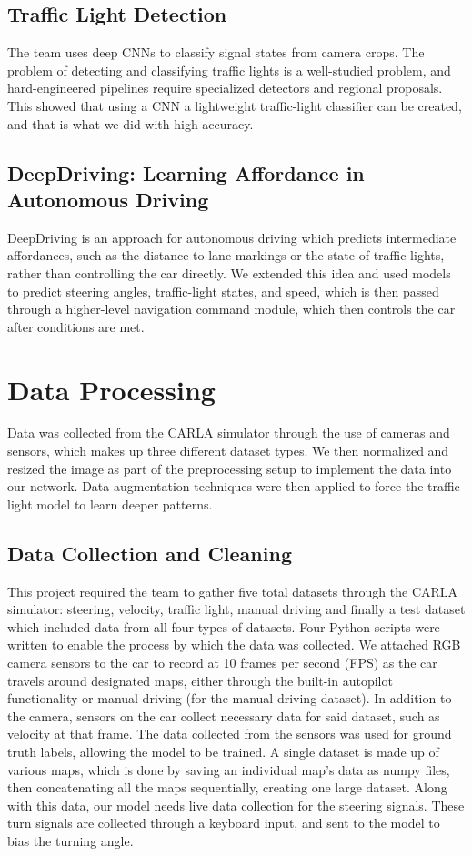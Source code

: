 \documentclass{article} %
\begin{document}
\subsection{Traffic Light Detection \citep{3.4Ref}}
The team uses deep CNNs to classify signal states from camera crops. The problem of detecting and classifying traffic lights is a
well-studied problem, and hard-engineered pipelines require specialized detectors and regional proposals. This showed that using a
CNN a lightweight traffic-light classifier can be created, and that is what we did with high accuracy.

\subsection{DeepDriving: Learning Affordance in Autonomous Driving \citep{3.5Ref}}
DeepDriving is an approach for autonomous driving which predicts intermediate affordances, such as the distance to
lane markings or the state of traffic lights, rather than controlling the car directly. We extended this idea and used
models to predict steering angles, traffic-light states, and speed, which is then passed through a higher-level navigation
command module, which then controls the car after conditions are met.


\section{Data Processing}

Data was collected from the CARLA simulator through the use of cameras and sensors, which makes up three different dataset types. We then normalized and resized the image as part of the preprocessing setup to implement the data into our network. Data augmentation techniques were then applied to force the traffic light model to learn deeper patterns.

\subsection{Data Collection and Cleaning}
This project required the team to gather five total datasets through the CARLA simulator: steering, velocity, traffic light, manual driving
and finally a test dataset which included data from all four types of datasets. Four Python scripts were written to enable the process by 
which the data was collected. We attached RGB camera sensors to the car to record at 10 frames per second (FPS) as the car travels around 
designated maps, either through the built-in autopilot functionality or manual driving (for the manual driving dataset). In addition to the camera, 
sensors on the car collect necessary data for said dataset, such as velocity at that frame. The data collected from the sensors was used for ground 
truth labels, allowing the model to be trained. A single dataset is made up of various maps, which is done by saving an individual map’s data as numpy 
files, then concatenating all the maps sequentially, creating one large dataset. Along with this data, our model needs live data collection for the steering signals.
These turn signals are collected through a keyboard input, and sent to the model to bias the turning angle.
\end{document}
